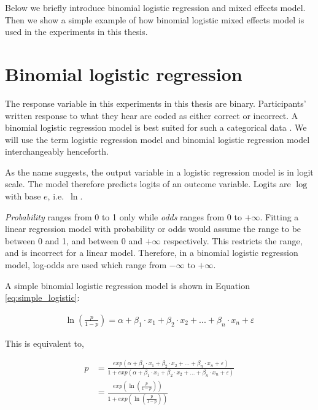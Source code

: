 \documentclass[a4paper, nobind]{templates/ociamthesis}
\begin{document}
Below we briefly introduce binomial logistic regression and mixed effects model.
Then we show a simple example of how binomial logistic mixed effects model is used in the experiments in this thesis.

\hypertarget{binomial-logistic-regression}{%
\section{Binomial logistic regression}\label{binomial-logistic-regression}}

The response variable in this experiments in this thesis are binary.
Participants' written response to what they hear are coded as either correct or incorrect.
A binomial logistic regression model is best suited for such a categorical data \autocite{Jaeger2008}.
We will use the term logistic regression model and binomial logistic regression model interchangeably henceforth.

As the name suggests, the output variable in a logistic regression model is in logit scale.
The model therefore predicts logits of an outcome variable.
Logits are \(\log\) with base \(e\), i.e.~\(\ln\).

\emph{Probability} ranges from 0 to 1 only while \emph{odds} ranges from 0 to \(+\infty\).
Fitting a linear regression model with probability or odds would assume the range to be between 0 and 1, and between 0 and \(+\infty\) respectively.
This restricts the range, and is incorrect for a linear model.
Therefore, in a binomial logistic regression model, log-odds are used which range from \(-\infty\) to \(+\infty\).

A simple binomial logistic regression model is shown in Equation \ref{eq:simple_logistic}:

\begin{align} \label{eq:simple_logistic}
\ln(\frac{p}{1-p}) =
\alpha + 
\beta_{1}\cdot{x_1} + 
\beta_{2}\cdot{x_2} + ... +
\beta_{n}\cdot{x_n} + \varepsilon
\end{align}

This is equivalent to,

\begin{align} \label{eq:logit-to-prob_long}
p &=
{\frac{exp(\alpha + 
\beta_{1}\cdot{x_1} + 
\beta_{2}\cdot{x_2} + ... +
\beta_{n}\cdot{x_n} + \varepsilon)}
{1 + exp (\alpha + 
\beta_{1}\cdot{x_1} + 
\beta_{2}\cdot{x_2} + ... +
\beta_{n}\cdot{x_n} + \varepsilon)}}\\ \label{eq:logit-to-prob_short}
&= {\frac{exp(\ln(\frac{p}{1-p}))}{1 + exp (\ln(\frac{p}{1-p}))}}
\end{align}
\end{document}
